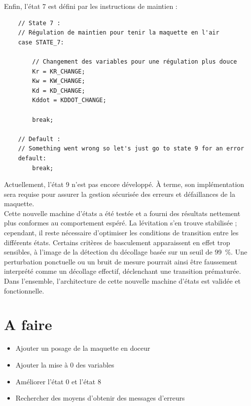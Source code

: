 Enfin, l'état 7 est défini par les instructions de maintien :

\begin{verbatim}
    // State 7 :
    // Régulation de maintien pour tenir la maquette en l'air
    case STATE_7:

        // Changement des variables pour une régulation plus douce
        Kr = KR_CHANGE;
        Kw = KW_CHANGE;
        Kd = KD_CHANGE;
        Kddot = KDDOT_CHANGE;

        break;

    // Default :
    // Something went wrong so let's just go to state 9 for an error
    default:
        break;
\end{verbatim}

Actuellement, l'état 9 n'est pas encore développé. À terme, son implémentation sera requise pour assurer la gestion sécurisée des erreurs et défaillances de la maquette.\\

Cette nouvelle machine d'états a été testée et a fourni des résultats nettement plus conformes au comportement espéré. La lévitation s'en trouve stabilisée ; cependant, il reste nécessaire d'optimiser les conditions de transition entre les différents états. Certains critères de basculement apparaissent en effet trop sensibles, à l'image de la détection du décollage basée sur un seuil de 99~\%. Une perturbation ponctuelle ou un bruit de mesure pourrait ainsi être faussement interprété comme un décollage effectif, déclenchant une transition prématurée.\\

Dans l'ensemble, l'architecture de cette nouvelle machine d'états est validée et fonctionnelle.

\section{A faire}
\begin{itemize}
    \item Ajouter un posage de la maquette en doceur
    \item Ajouter la mise à 0 des variables
    \item Améliorer l'état 0 et l'état 8
    \item Rechercher des moyens d'obtenir des messages d'erreurs
\end{itemize}
